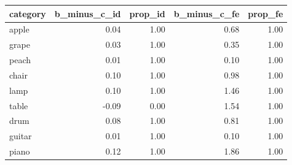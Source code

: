 \begin{table}[ht]
\centering
\begin{tabular}{lrrrr}
  \hline
category & b\_minus\_c\_id & prop\_id & b\_minus\_c\_fe & prop\_fe \\ 
  \hline
apple & 0.04 & 1.00 & 0.68 & 1.00 \\ 
  grape & 0.03 & 1.00 & 0.35 & 1.00 \\ 
  peach & 0.01 & 1.00 & 0.10 & 1.00 \\ 
  chair & 0.10 & 1.00 & 0.98 & 1.00 \\ 
  lamp & 0.10 & 1.00 & 1.46 & 1.00 \\ 
  table & -0.09 & 0.00 & 1.54 & 1.00 \\ 
  drum & 0.08 & 1.00 & 0.81 & 1.00 \\ 
  guitar & 0.01 & 1.00 & 0.10 & 1.00 \\ 
  piano & 0.12 & 1.00 & 1.86 & 1.00 \\ 
   \hline
\end{tabular}
\end{table}
